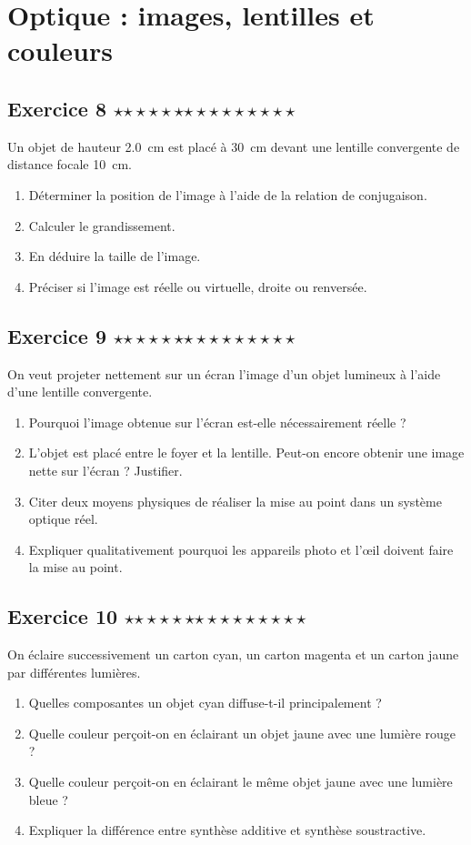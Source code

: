 \documentclass[11pt,a4paper]{article}
\newcommand{\etoiles}[1]{%
\ifcase#1\or $\star$\or $\star\star$\or $\star\star\star$\or $\star\star\star\star$\or $\star\star\star\star\star$\fi}
\newcommand{\exostar}[2]{\subsection*{Exercice #1 \hfill \etoiles{#2}}}
\begin{document}
\section{Optique : images, lentilles et couleurs}

\exostar{8}{2}
Un objet de hauteur \SI{2,0}{cm} est placé à \SI{30}{cm} devant une lentille convergente de distance focale \SI{10}{cm}.
\begin{enumerate}[label=\alph*)]
    \item Déterminer la position de l'image à l'aide de la relation de conjugaison.
    \item Calculer le grandissement.
    \item En déduire la taille de l'image.
    \item Préciser si l'image est réelle ou virtuelle, droite ou renversée.
\end{enumerate}

\exostar{9}{3}
On veut projeter nettement sur un écran l'image d'un objet lumineux à l'aide d'une lentille convergente.
\begin{enumerate}[label=\alph*)]
    \item Pourquoi l'image obtenue sur l'écran est-elle nécessairement réelle ?
    \item L'objet est placé entre le foyer et la lentille. Peut-on encore obtenir une image nette sur l'écran ? Justifier.
    \item Citer deux moyens physiques de réaliser la mise au point dans un système optique réel.
    \item Expliquer qualitativement pourquoi les appareils photo et l'œil doivent faire la mise au point.
\end{enumerate}

\exostar{10}{2}
On éclaire successivement un carton cyan, un carton magenta et un carton jaune par différentes lumières.
\begin{enumerate}[label=\alph*)]
    \item Quelles composantes un objet cyan diffuse-t-il principalement ?
    \item Quelle couleur perçoit-on en éclairant un objet jaune avec une lumière rouge ?
    \item Quelle couleur perçoit-on en éclairant le même objet jaune avec une lumière bleue ?
    \item Expliquer la différence entre synthèse additive et synthèse soustractive.
\end{enumerate}
\end{document}
